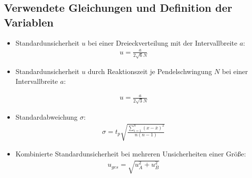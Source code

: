
\subsection{Verwendete Gleichungen und Definition der Variablen}\label{VGuD}
\begin{itemize}
\item Standardunsicherheit $u$ bei einer Dreieckverteilung mit der Intervallbreite $a$:
\begin{align}
	u=\frac{a}{2\sqrt{6}N} \label{su3}
\end{align} 

\item Standardunsicherheit $u$ durch Reaktionszeit je Pendelschwingung $N$ bei einer Intervallbreite $a$:

\begin{align}
	u=\frac{a}{2\sqrt{3}N} \label{sur}
\end{align} 


\item Standardabweichung $\sigma$:
\begin{align}
\sigma=t_p \sqrt{\frac{\sum_{i=1}^{n}(x-\bar{x})^2}{n(n-1)}}
\label{sigma}
\end{align}

\item Kombinierte Standardunsicherheit bei mehreren Unsicherheiten einer Größe:
\begin{align}
u_{ges}=\sqrt{u_A^2+u_B^2}
\label{kombsu}
\end{align}

\end{itemize}


